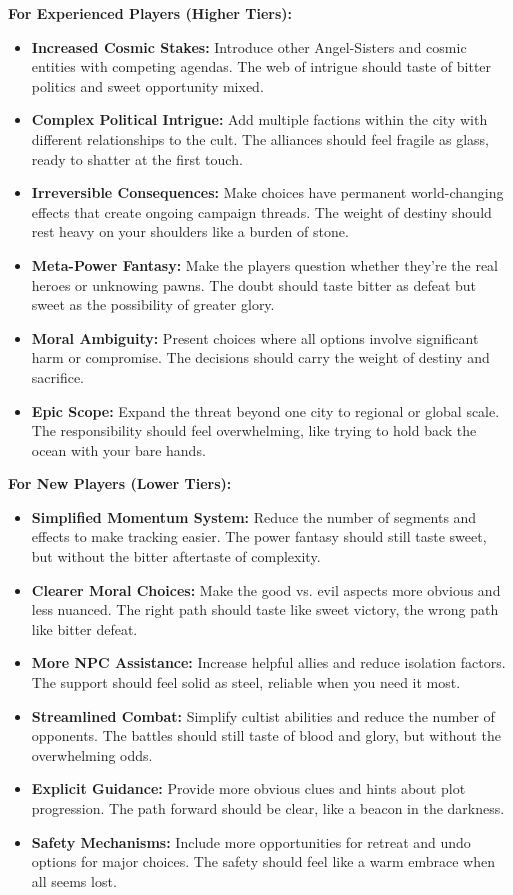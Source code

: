 \documentclass[11pt]{article}
\begin{document}
\textbf{For Experienced Players (Higher Tiers):}
\begin{itemize}
\item \textbf{Increased Cosmic Stakes:} Introduce other Angel-Sisters and cosmic entities with competing agendas. The web of intrigue should taste of bitter politics and sweet opportunity mixed.
\item \textbf{Complex Political Intrigue:} Add multiple factions within the city with different relationships to the cult. The alliances should feel fragile as glass, ready to shatter at the first touch.
\item \textbf{Irreversible Consequences:} Make choices have permanent world-changing effects that create ongoing campaign threads. The weight of destiny should rest heavy on your shoulders like a burden of stone.
\item \textbf{Meta-Power Fantasy:} Make the players question whether they're the real heroes or unknowing pawns. The doubt should taste bitter as defeat but sweet as the possibility of greater glory.
\item \textbf{Moral Ambiguity:} Present choices where all options involve significant harm or compromise. The decisions should carry the weight of destiny and sacrifice.
\item \textbf{Epic Scope:} Expand the threat beyond one city to regional or global scale. The responsibility should feel overwhelming, like trying to hold back the ocean with your bare hands.
\end{itemize}

\textbf{For New Players (Lower Tiers):}
\begin{itemize}
\item \textbf{Simplified Momentum System:} Reduce the number of segments and effects to make tracking easier. The power fantasy should still taste sweet, but without the bitter aftertaste of complexity.
\item \textbf{Clearer Moral Choices:} Make the good vs. evil aspects more obvious and less nuanced. The right path should taste like sweet victory, the wrong path like bitter defeat.
\item \textbf{More NPC Assistance:} Increase helpful allies and reduce isolation factors. The support should feel solid as steel, reliable when you need it most.
\item \textbf{Streamlined Combat:} Simplify cultist abilities and reduce the number of opponents. The battles should still taste of blood and glory, but without the overwhelming odds.
\item \textbf{Explicit Guidance:} Provide more obvious clues and hints about plot progression. The path forward should be clear, like a beacon in the darkness.
\item \textbf{Safety Mechanisms:} Include more opportunities for retreat and undo options for major choices. The safety should feel like a warm embrace when all seems lost.
\end{itemize}
\end{document}
